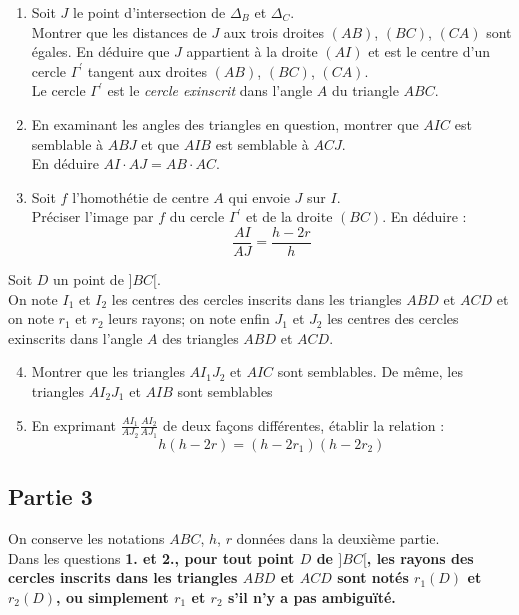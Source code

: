 \documentclass[landscape,twocolumn,leqno,a4paper,10pt]{report} %
\newcommand\n{\noindent}
\renewcommand{\textbf}[1]{\begingroup\bfseries\mathversion{bold}#1\endgroup}		%
\begin{document}
\begin{enumerate}
	\item Soit $J$ le point d'intersection de $\Delta_{B}$ et $\Delta_{C}$.\\
	Montrer que les distances de $J$ aux trois droites $(A B)$, $(B C)$, $(C A)$ sont égales. En déduire que $J$ appartient à la droite $(A I)$ et est le centre d'un cercle $\Gamma^{\prime}$ tangent aux droites $(A B)$, $(B C)$, $(C A)$.\\
	Le cercle $\Gamma^{\prime}$ est le \textit{cercle exinscrit} dans l'angle $A$ du triangle $A B C$.
	\item En examinant les angles des triangles en question, montrer que $A I C$ est semblable à $A B J$ et que $A I B$ est semblable à $A C J$.\\
	En déduire $A I \cdot A J=A B \cdot A C$.
	\item Soit $f$ l'homothétie de centre $A$ qui envoie $J$ sur $I$.\\
	Préciser l'image par $f$ du cercle $\Gamma^{\prime}$ et de la droite $(B C)$. En déduire :
	$$\frac{A I}{A J}=\frac{h-2 r}{h}$$
\end{enumerate}

\n Soit $D$ un point de $]B C[$.\\
\n On note $I_{1}$ et $I_{2}$ les centres des cercles inscrits dans les triangles $A B D$ et $A C D$ et on note $r_{1}$ et $r_{2}$ leurs rayons; on note enfin $J_{1}$ et $J_{2}$ les centres des cercles exinscrits dans l'angle $A$ des triangles $A B D$ et $A C D$.

\begin{enumerate}\setcounter{enumi}{3}
	\item Montrer que les triangles $A I_{1} J_{2}$ et $A I C$ sont semblables. De même, les triangles $A I_{2} J_{1}$ et $A I B$ sont semblables
	\item En exprimant $\frac{A I_{1}}{A J_{2}} \frac{A I_{2}}{A J_{1}}$ de deux façons différentes, établir la relation :
	$$h(h-2 r)=\left(h-2 r_{1}\right)\left(h-2 r_{2}\right)$$
\end{enumerate}


\subsection{Partie 3}


\n On conserve les notations $A B C$, $h$, $r$ données dans la deuxième partie.\\
Dans les questions \textbf{1.} et \textbf{2.}, pour tout point $D$ de $]B C[$, les rayons des cercles inscrits dans les triangles $A B D$ et $A C D$ sont notés $r_{1}(D)$ et $r_{2}(D)$, ou simplement $r_{1}$ et $r_{2}$ s'il n'y a pas ambiguïté.
\end{document}
